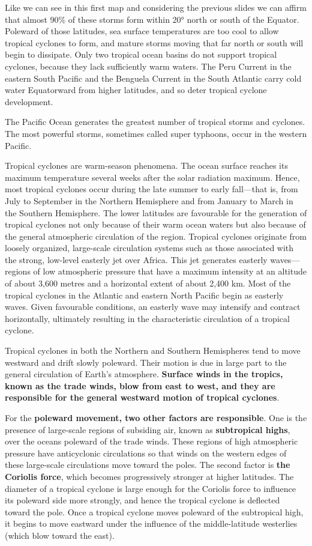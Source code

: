 \documentclass[12pt,oneside]{book}
\begin{document}
Like we can see in this first map and considering the previous slides we
can affirm that almost 90\% of these storms form within 20° north or
south of the Equator. Poleward of those latitudes, sea surface
temperatures are too cool to allow tropical cyclones to form, and mature
storms moving that far north or south will begin to dissipate. Only two
tropical ocean basins do not support tropical cyclones, because they
lack sufficiently warm waters. The Peru Current in the eastern South
Pacific and the Benguela Current in the South Atlantic carry cold water
Equatorward from higher latitudes, and so deter tropical cyclone
development.

The Pacific Ocean generates the greatest number of tropical storms and
cyclones. The most powerful storms, sometimes called super typhoons,
occur in the western Pacific.

Tropical cyclones are warm-season phenomena. The ocean surface reaches
its maximum temperature several weeks after the solar radiation maximum.
Hence, most tropical cyclones occur during the late summer to early
fall---that is, from July to September in the Northern Hemisphere and
from January to March in the Southern Hemisphere. The lower latitudes
are favourable for the generation of tropical cyclones not only because
of their warm ocean waters but also because of the general atmospheric
circulation of the region. Tropical cyclones originate from loosely
organized, large-scale circulation systems such as those associated with
the strong, low-level easterly jet over Africa. This jet generates
easterly waves---regions of low atmospheric pressure that have a maximum
intensity at an altitude of about 3,600 metres and a horizontal extent
of about 2,400 km. Most of the tropical cyclones in the Atlantic and
eastern North Pacific begin as easterly waves. Given favourable
conditions, an easterly wave may intensify and contract horizontally,
ultimately resulting in the characteristic circulation of a tropical
cyclone.

Tropical cyclones in both the Northern and Southern Hemispheres tend to
move westward and drift slowly poleward. Their motion is due in large
part to the general circulation of Earth's atmosphere. \textbf{Surface
winds in the tropics, known as the trade winds, blow from east to west,
and they are responsible for the general westward motion of tropical
cyclones}.

For the \textbf{poleward movement, two other factors are responsible}.
One is the presence of large-scale regions of subsiding air, known as
\textbf{subtropical highs}, over the oceans poleward of the trade winds.
These regions of high atmospheric pressure have anticyclonic
circulations so that winds on the western edges of these large-scale
circulations move toward the poles. The second factor is \textbf{the
Coriolis force}, which becomes progressively stronger at higher
latitudes. The diameter of a tropical cyclone is large enough for the
Coriolis force to influence its poleward side more strongly, and hence
the tropical cyclone is deflected toward the pole. Once a tropical
cyclone moves poleward of the subtropical high, it begins to move
eastward under the influence of the middle-latitude westerlies (which
blow toward the east).
\end{document}
